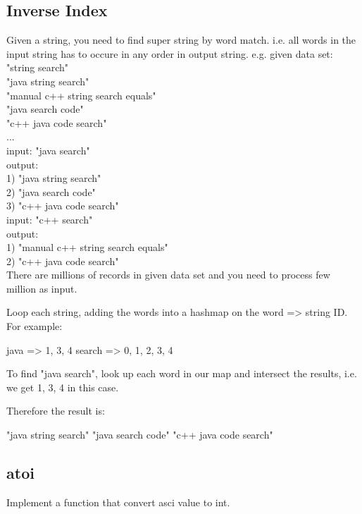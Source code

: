 \subsection{Inverse Index}
Given a string, you need to find super string by word match. i.e. all words in the input string has to occure in any order in output string. 
e.g. given data set: \\
"string search" \\
"java string search" \\
"manual c++ string search equals" \\
"java search code" \\
"c++ java code search" \\
... \\

input: "java search" \\
output: \\
1) "java string search" \\
2) "java search code" \\
3) "c++ java code search" \\

input: "c++ search" \\
output: \\
1) "manual c++ string search equals" \\
2) "c++ java code search" \\

There are millions of records in given data set and you need to process few million as input.

\begin{Code}
	Loop each string, adding the words into a hashmap on the word => string ID. For example: 
	
	java => 1, 3, 4 
	search => 0, 1, 2, 3, 4 
	
	To find "java search", look up each word in our map and intersect the results, i.e. we get 1, 3, 4 in this case. 
	
	Therefore the result is: 
	
	"java string search" 
	"java search code" 
	"c++ java code search" 
\end{Code}

\subsection{atoi}
Implement a function that convert asci value to int.